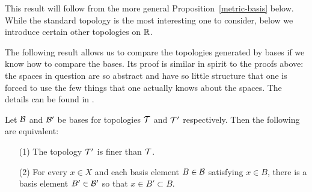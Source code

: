 This result will follow from the more general Proposition~\ref{metric-basis} below. While the standard topology is the most interesting one to consider, below we introduce certain other topologies on $\mathbb{R}$.

The following result allows us to compare the topologies generated by bases if we know how to compare the bases. Its proof is similar in spirit to the proofs above: the spaces in question are so abstract and have so little structure that one is forced to use the few things that one actually knows about the spaces. The details can be found in \cite[Lem.~13.3]{Mun}.

\begin{lem}
  \label{compare-bases}
  Let $\mathcal{B}$ and $\mathcal{B}'$ be bases for topologies $\mathcal{T}$ and $\mathcal{T}'$ respectively. Then the following are equivalent:
  \begin{itemize}
    \item[(1)] The topology $\mathcal{T}'$ is finer than $\mathcal{T}$.
    \item[(2)] For every $x \in X$ and each basis element $B \in \mathcal{B}$ satisfying $x \in B$, there is a basis element $B' \in \mathcal{B}'$ so that $x \in B' \subset B$.
  \end{itemize}
\end{lem}

